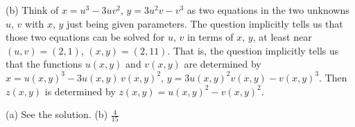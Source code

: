 \begin{hint}
(b) Think of $x=u^3-3uv^2$, $y=3u^2v-v^3$ as two equations in the two 
    unknowns $u$, $v$ with $x$, $y$ just being given parameters. The
    question implicitly tells us that those two equations can be solved
    for $u$, $v$ in terms of $x$, $y$, at least near
    $(u,v)=(2,1)$, $(x,y)=(2,11)$. That is, the question implicitly
    tells us that the functions $u(x,y)$ and $v(x,y)$ are determined by
    $x=u(x,y)^3-3u(x,y)\,v(x,y)^2$, $y=3u(x,y)^2v(x,y)-v(x,y)^3$.
    Then $z(x,y)$ is determined by $z(x,y)=u(x,y)^2-v(x,y)^2$.
\end{hint}

\begin{answer}
(a) See the solution.\qquad
(b) $\frac{4}{15}$
\end{answer}

